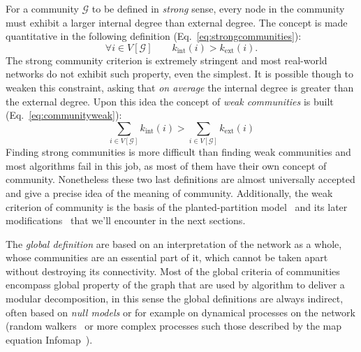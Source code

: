 For a community $\mathcal{G}$ to be defined in \emph{strong} sense, every node in the community must exhibit a larger internal degree than external degree. The concept is made quantitative in the following definition (Eq.~\ref{eq:strongcommunities}):
\begin{equation}\label{eq:strongcommunities}
\forall i \in V[\mathcal{G}] \qquad k_{\textrm{int}}(i) > k_{\textrm{ext}}(i).
\end{equation}
The strong community criterion is extremely stringent and most real-world networks do not exhibit such property, even the simplest.
It is possible though to weaken this constraint, asking that \emph{on average} the internal degree is greater than the external degree.  Upon this idea the concept of \emph{weak communities} is built (Eq.~\ref{eq:communityweak}):
\begin{equation}\label{eq:communityweak}
\sum \limits_{i \in V[\mathcal{G}]} k_{\textrm{int}}(i) > \sum \limits_{i \in V[\mathcal{G}]} k_{\textrm{ext}}(i)
\end{equation}
Finding strong communities is more difficult than finding weak communities and most algorithms fail in this job, as most of them have their own concept of community. Nonetheless these two last definitions are almost universally accepted and give a precise idea of the meaning of community. Additionally, the weak criterion of community is the basis of the planted-partition model~\cite{condon2000} and its later modifications~\cite{lancichinetti2008} that we'll encounter in the next sections. 

The \emph{global definition} are based on an interpretation of the network as a whole, whose communities are an essential part of it, which cannot be taken apart without destroying its connectivity. Most of the global criteria of communities encompass global property of the graph that are used by algorithm to deliver a modular decomposition, in this sense the global definitions are always indirect, often based on \emph{null models} or for example on dynamical processes on the network (random walkers~\cite{pons2006} or more complex processes such those described by the map equation Infomap~\cite{rosvall2008}).

